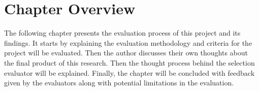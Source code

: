 \section{Chapter Overview}

The following chapter presents the evaluation process of this project and its findings. It starts by explaining the evaluation methodology and criteria for the project will be evaluated. Then the author discusses their own thoughts about the final product of this research. Then the thought process behind the selection evaluator will be explained. Finally, the chapter will be concluded with feedback given by the evaluators along with potential limitations in the evaluation.